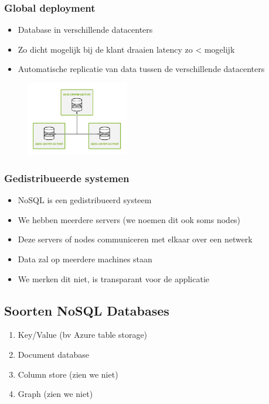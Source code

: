 \documentclass{article}
\begin{document}
\subsubsection{Global deployment}

\begin{itemize}
    \item Database in verschillende datacenters
    \item Zo dicht mogelijk bij de klant draaien latency zo < mogelijk
    \item Automatische replicatie van data tussen de verschillende datacenters
\end{itemize}

\begin{figure}[H]
    \centering
    \includegraphics[width=0.4\textwidth]{global-deployment.png}
    \caption{}
\end{figure}

\subsubsection{Gedistribueerde systemen}

\begin{itemize}
    \item NoSQL is een gedistribueerd systeem
    \item We hebben meerdere servers (we noemen dit ook soms nodes)
    \item Deze servers of nodes communiceren met elkaar over een netwerk
    \item Data zal op meerdere machines staan
    \item We merken dit niet, is transparant voor de applicatie
\end{itemize}

\subsection{Soorten NoSQL Databases}

\begin{enumerate}
    \item Key/Value (bv Azure table storage)
    \item Document database
    \item Column store (zien we niet)
    \item Graph (zien we niet)
\end{enumerate}
\end{document}
